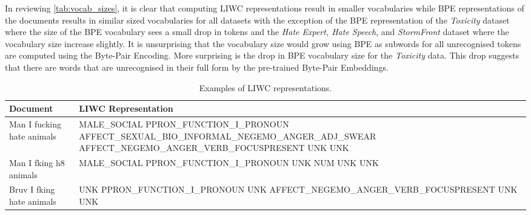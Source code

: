 \begin{table}
  \centering
  \caption{Word token and BPE representation.}
  \label{tab:bpe_tok}
\end{table}

In reviewing \cref{tab:vocab_sizes}, it is clear that computing LIWC representations result in smaller vocabularies while BPE representations of the documents results in similar sized vocabularies for all datasets with the exception of the BPE representation of the \textit{Toxicity} dataset where the size of the BPE vocabulary sees a small drop in tokens and the \textit{Hate Expert, Hate Speech}, and \textit{StormFront} dataset where the vocabulary size increase slightly. It is unsurprising that the vocabulary size would grow using BPE as subwords for all unrecognised tokens are computed using the Byte-Pair Encoding. More surprising is the drop in BPE vocabulary size for the \textit{Toxicity} data. This drop suggests that there are words that are unrecognised in their full form by the pre-trained Byte-Pair Embeddings.

\begin{table}[]
\centering
\footnotesize
\begin{tabular}{l|p{10.5cm}}
Document                   & LIWC Representation \\ \hline
Man I fucking hate animals & MALE\_SOCIAL PPRON\_FUNCTION\_I\_PRONOUN AFFECT\_SEXUAL\_BIO\_INFORMAL\_NEGEMO\_ANGER\_ADJ\_SWEAR AFFECT\_NEGEMO\_ANGER\_VERB\_FOCUSPRESENT UNK UNK \\\hline
Man I fking h8 animals     & MALE\_SOCIAL PPRON\_FUNCTION\_I\_PRONOUN UNK NUM UNK UNK \\\hline
Bruv I fking hate animals  & UNK PPRON\_FUNCTION\_I\_PRONOUN UNK AFFECT\_NEGEMO\_ANGER\_VERB\_FOCUSPRESENT UNK UNK
\end{tabular}
\caption{Examples of LIWC representations.}
\label{tab:liwc_tok}
\end{table}

